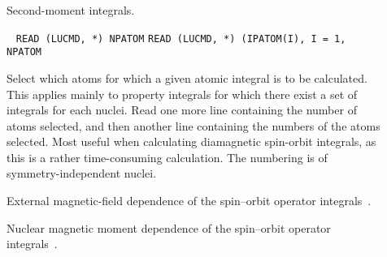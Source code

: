 \begin{description}
\item[] Second-moment integrals.


\item[]\verb| |\newline
\verb|READ (LUCMD, *) NPATOM|\newline
\verb|READ (LUCMD, *) (IPATOM(I), I = 1, NPATOM|

Select which atoms for which a given atomic integral is to be
calculated. This applies mainly to property integrals for which
there exist a set of integrals for each nuclei. Read one more line
containing the number of atoms selected, and then another line
containing the numbers of the atoms selected. Most useful when
calculating diamagnetic spin-orbit
integrals, as this is a rather time-consuming calculation. The
numbering is of symmetry-independent nuclei.

\item[] External magnetic-field dependence of the spin--orbit
operator integrals~\cite{jvkrovjcp111}.


\item[] Nuclear magnetic moment dependence of the spin--orbit
operator integrals~\cite{jvkrovjcc20}.



\end{description}
